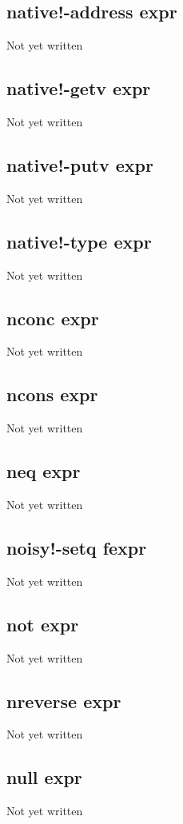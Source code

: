 \documentclass[a4paper,11pt]{article}
\begin{document}
\subsection{\ttfamily native!-address expr}
Not yet written

\subsection{\ttfamily native!-getv expr}
Not yet written

\subsection{\ttfamily native!-putv expr}
Not yet written

\subsection{\ttfamily native!-type expr}
Not yet written

\subsection{\ttfamily nconc expr}
Not yet written

\subsection{\ttfamily ncons expr}
Not yet written

\subsection{\ttfamily neq expr}
Not yet written

\subsection{\ttfamily noisy!-setq fexpr}
Not yet written

\subsection{\ttfamily not expr}
Not yet written

\subsection{\ttfamily nreverse expr}
Not yet written

\subsection{\ttfamily null expr}
Not yet written
\end{document}
